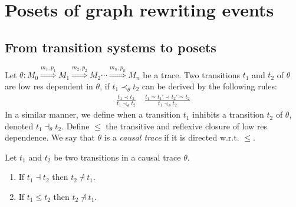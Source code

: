 \section{Posets of graph rewriting events}

\subsection{From transition systems to posets}
\label{sec:concret}

\begin{definition}
  \label{def:causal_trace}
  Let $\theta:M_0\overset{m_1,p_1}{\Rightarrow} M_1\overset{m_2,p_2}{\Rightarrow} M_2 \cdots \overset{m_n,p_n}{\Rightarrow} M_n$ be a trace.
  Two transitions $t_1$ and $t_2$ of $\theta$ are low res dependent in $\theta$, if $t_1\prec_{\theta} t_2$ can be derived by the following rules:
  \begin{align*}
    \frac{t_1 \prec t_2}{t_1 \prec_{\theta} t_2}\quad
    \frac{t_1\simeq t_1'\prec t_2'\simeq t_2}{t_1 \prec_{\theta} t_2}
  \end{align*}
  In a similar manner, we define when a transition $t_1$ inhibits a transition $t_2$ of $\theta$, denoted $t_1\dashv_{\theta} t_2$.
  Define $\leq$ the transitive and reflexive closure of low res dependence. We say that $\theta$ is a \emph{causal trace} if it is directed w.r.t. $\leq$.
\end{definition}

\begin{lemma}
  \label{lem:inhibiting_pair}
  Let $t_1$ and $t_2$ be two transitions in a causal trace $\theta$.
  \begin{enumerate}
  \item If $t_1\dashv t_2$ then $t_2\not\dashv t_1$.
  \item If $t_1\leq t_2$ then $t_2\not\dashv t_1$.
  \end{enumerate}
\end{lemma}

